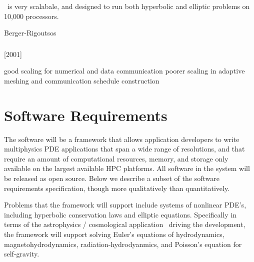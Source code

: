 \documentclass{article}
\begin{document}
\chombo\ is very scalabale, and designed to run both hyperbolic and
elliptic problems on 10,000 processors.

Berger-Rigoutsos 



\subsubsection{} \label{sss:samrai}

[2001]

good scaling for numerical and data communication
poorer scaling in adaptive meshing and communication schedule construction 

\subsubsection{\gadget } \label{sss:chombo}


\newpage
\section{Software Requirements} \label{s:requirements}


The software will be a framework that allows application developers to
write multiphysics PDE applications that span a wide range of
resolutions, and that require an amount of computational resources,
memory, and storage only available on the largest available HPC
platforms.  All software in the system will be released as open
source.  Below we describe a subset of the software requirements
specification, though more qualitatively than quantitatively.

Problems that the framework will support include systems of nonlinear
PDE's, including hyperbolic conservation laws and elliptic equations.
Specifically in terms of the astrophysics / cosmological application
\enzoii\ driving the development, the framework will support solving
Euler's equations of hydrodynamics, magnetohydrodynamics,
radiation-hydrodyanmics, and Poisson's equation for self-gravity.
\end{document}
